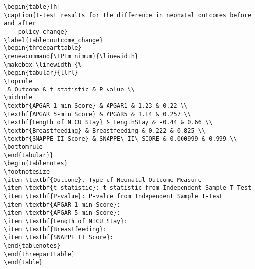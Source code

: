\documentclass[11pt]{article}
\begin{document}
\begin{Verbatim}[tabsize=4]
\begin{table}[h]
\caption{T-test results for the difference in neonatal outcomes before and after
	policy change}
\label{table:outcome_change}
\begin{threeparttable}
\renewcommand{\TPTminimum}{\linewidth}
\makebox[\linewidth]{%
\begin{tabular}{llrl}
\toprule
 & Outcome & t-statistic & P-value \\
\midrule
\textbf{APGAR 1-min Score} & APGAR1 & 1.23 & 0.22 \\
\textbf{APGAR 5-min Score} & APGAR5 & 1.14 & 0.257 \\
\textbf{Length of NICU Stay} & LengthStay & -0.44 & 0.66 \\
\textbf{Breastfeeding} & Breastfeeding & 0.222 & 0.825 \\
\textbf{SNAPPE II Score} & SNAPPE\_II\_SCORE & 0.000999 & 0.999 \\
\bottomrule
\end{tabular}}
\begin{tablenotes}
\footnotesize
\item \textbf{Outcome}: Type of Neonatal Outcome Measure
\item \textbf{t-statistic}: t-statistic from Independent Sample T-Test
\item \textbf{P-value}: P-value from Independent Sample T-Test
\item \textbf{APGAR 1-min Score}:
\item \textbf{APGAR 5-min Score}:
\item \textbf{Length of NICU Stay}:
\item \textbf{Breastfeeding}:
\item \textbf{SNAPPE II Score}:
\end{tablenotes}
\end{threeparttable}
\end{table}

\end{Verbatim}




\end{document}
